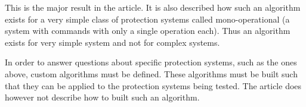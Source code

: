 This is the major result in the article.
It is also described how such an algorithm exists for a very simple class of protection systems called mono-operational (a system with commands with only a single operation each).
Thus an algorithm exists for very simple system and not for complex systems.

In order to answer questions about specific protection systems, such as the ones above, custom algorithms must be defined.
These algorithms must be built such that they can be applied to the protection systems being tested.
The article does however not describe how to built such an algorithm.

